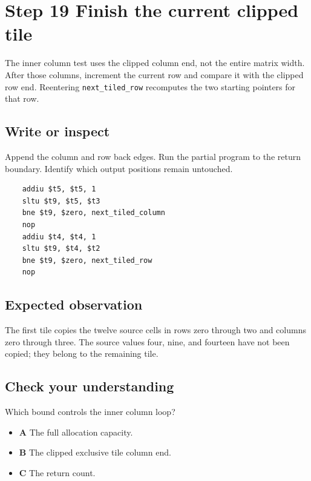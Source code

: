 \section{Step 19 Finish the current clipped tile}\label{transpose-s19}

The inner column test uses the clipped column end, not the entire matrix width. After those columns, increment the current row and compare it with the clipped row end. Reentering \texttt{next\_tiled\_row} recomputes the two starting pointers for that row.

\subsection{Write or inspect}
Append the column and row back edges. Run the partial program to the return boundary. Identify which output positions remain untouched.

\begin{verbatim}
    addiu $t5, $t5, 1
    sltu $t9, $t5, $t3
    bne $t9, $zero, next_tiled_column
    nop
    addiu $t4, $t4, 1
    sltu $t9, $t4, $t2
    bne $t9, $zero, next_tiled_row
    nop
\end{verbatim}

\subsection{Expected observation}
The first tile copies the twelve source cells in rows zero through two and columns zero through three. The source values four, nine, and fourteen have not been copied; they belong to the remaining tile.

\subsection{Check your understanding}
Which bound controls the inner column loop?

\begin{itemize}
  \item \textbf{A} The full allocation capacity.
  \item \textbf{B} The clipped exclusive tile column end.
  \item \textbf{C} The return count.
\end{itemize}
